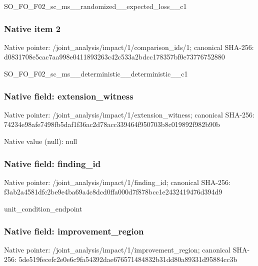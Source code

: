 \documentclass[10pt,a4paper]{article}
\begin{document}
\begingroup\raggedright\sloppy SO\_\allowbreak{}FO\_\allowbreak{}F02\_\allowbreak{}sc\_\allowbreak{}ms\_\allowbreak{}\_\allowbreak{}randomized\_\allowbreak{}\_\allowbreak{}expected\_\allowbreak{}loss\_\allowbreak{}\_\allowbreak{}c1\par\endgroup

\subsubsection{Native item 2}
Native pointer: /joint\_\allowbreak{}analysis/impact/1/comparison\_\allowbreak{}ids/1; canonical SHA-256: d0831708e5cac7aa998e0411893263c42c533a2bdcc178357bf0e73776752880

\begingroup\raggedright\sloppy SO\_\allowbreak{}FO\_\allowbreak{}F02\_\allowbreak{}sc\_\allowbreak{}ms\_\allowbreak{}\_\allowbreak{}deterministic\_\allowbreak{}\_\allowbreak{}deterministic\_\allowbreak{}\_\allowbreak{}c1\par\endgroup

\subsubsection{Native field: extension\_\allowbreak{}witness}
Native pointer: /joint\_\allowbreak{}analysis/impact/1/extension\_\allowbreak{}witness; canonical SHA-256: 74234e98afe7498fb5daf1f36ac2d78acc339464f950703b8c019892f982b90b

Native value (null): null

\subsubsection{Native field: finding\_\allowbreak{}id}
Native pointer: /joint\_\allowbreak{}analysis/impact/1/finding\_\allowbreak{}id; canonical SHA-256: f3ab2a4581dfc2be9e4ba69a4c8dcd0ffa000d7f878bcc1e2432419476d394d9

\begingroup\raggedright\sloppy unit\_\allowbreak{}condition\_\allowbreak{}endpoint\par\endgroup

\subsubsection{Native field: improvement\_\allowbreak{}region}
Native pointer: /joint\_\allowbreak{}analysis/impact/1/improvement\_\allowbreak{}region; canonical SHA-256: 5de519fecefc2e0e6c9fa54392dae676571484832b31dd80a89331d95884cc3b
\end{document}
